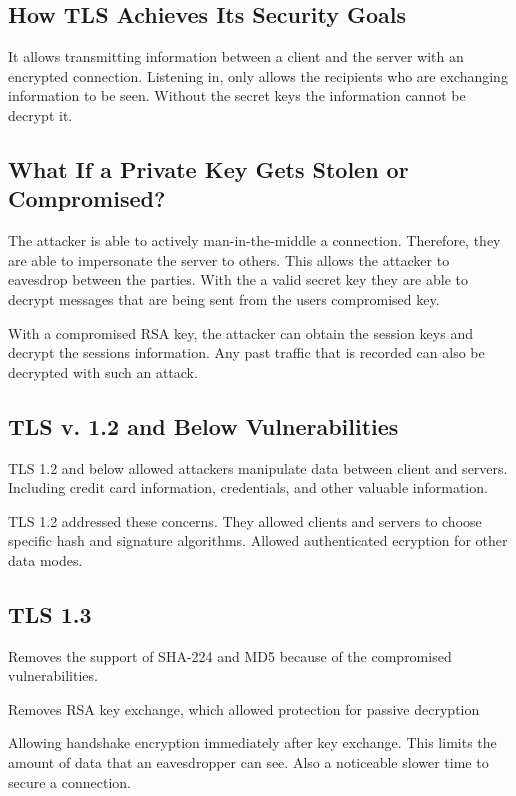 \documentclass[11pt]{article} %
\begin{document}
{\subsection{How TLS Achieves Its Security Goals}
It allows transmitting information between a client and the server with an encrypted connection. Listening in, only allows the recipients who are exchanging information to be seen. Without the secret keys the information cannot be decrypt it.
\subsection{What If a Private Key Gets Stolen or Compromised?}
{\parindent0pt The attacker is able to actively man-in-the-middle a connection.
Therefore, they are able to impersonate the server to others. This allows the 
attacker to eavesdrop between the parties. With the a valid secret key they are
able to decrypt messages that are being sent from the users compromised key.}

\bigskip
{\parindent0pt With a compromised RSA key, the attacker can obtain the session
keys and decrypt the sessions information. Any past traffic that is recorded 
can also be decrypted with such an attack.}

\subsection{TLS v. 1.2 and Below Vulnerabilities}
{\parindent0pt TLS 1.2 and below allowed attackers manipulate data between 
client and servers. Including credit card information, credentials, and other 
valuable information.}

\bigskip
{\parindent0pt TLS 1.2 addressed these concerns. They allowed clients and 
servers to choose specific hash and signature algorithms. Allowed authenticated
ecryption for other data modes.}

\subsection{TLS 1.3}
{\parindent0pt Removes the support of SHA-224 and MD5 because of the compromised
vulnerabilities.}

\bigskip
{\parindent0pt Removes RSA key exchange, which allowed protection for passive 
decryption}

\bigskip
{\parindent0pt Allowing handshake encryption immediately after key exchange. 
This limits the amount of data that an eavesdropper can see. Also a noticeable 
slower time to secure a connection.}

}
\end{document}
